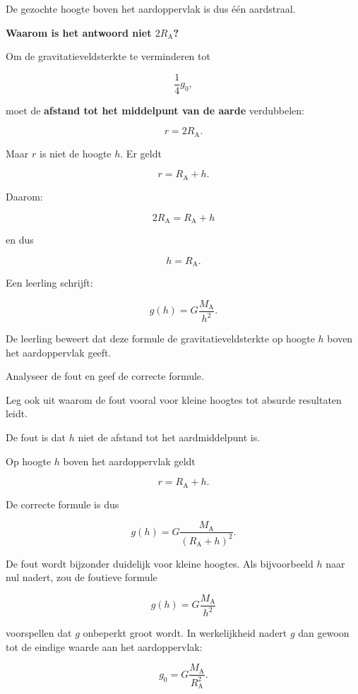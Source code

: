 \documentclass{ximera}
\begin{document}
\begin{oefening}{\oefU\ESS}
\begin{oplossing}
      De gezochte hoogte boven het aardoppervlak is dus één aardstraal.
      
      
      \textbf{Waarom is het antwoord niet $2R_\mathrm A$?}
      
      Om de gravitatieveldsterkte te verminderen tot
      
      \[
      \frac14g_0,
      \]
      
      moet de \textbf{afstand tot het middelpunt van de aarde} verdubbelen:
      
      \[
      r=2R_\mathrm A.
      \]
      
      Maar $r$ is niet de hoogte $h$. Er geldt
      
      \[
      r=R_\mathrm A+h.
      \]
      
      Daarom:
      
      \[
      2R_\mathrm A
      =
      R_\mathrm A+h
      \]
      
      en dus
      
      \[
      \boxed{
      h=R_\mathrm A.
      }
      \]
      
      \end{oplossing}

\end{oefening}


\begin{oefening}{\oefU}

Een leerling schrijft:

\[
g(h)
=
G\frac{M_\mathrm A}{h^2}.
\]

De leerling beweert dat deze formule de gravitatieveldsterkte op hoogte
$h$ boven het aardoppervlak geeft.

Analyseer de fout en geef de correcte formule.

Leg ook uit waarom de fout vooral voor kleine hoogtes tot absurde
resultaten leidt.


\begin{oplossing}

De fout is dat $h$ niet de afstand tot het aardmiddelpunt is.

Op hoogte $h$ boven het aardoppervlak geldt

\[
r=R_\mathrm A+h.
\]

De correcte formule is dus

\[
\boxed{
g(h)
=
G\frac{M_\mathrm A}{(R_\mathrm A+h)^2}.
}
\]

De fout wordt bijzonder duidelijk voor kleine hoogtes. Als bijvoorbeeld
$h$ naar nul nadert, zou de foutieve formule

\[
g(h)=G\frac{M_\mathrm A}{h^2}
\]

voorspellen dat $g$ onbeperkt groot wordt. In werkelijkheid nadert $g$
dan gewoon tot de eindige waarde aan het aardoppervlak:

\[
\boxed{
g_0=G\frac{M_\mathrm A}{R_\mathrm A^2}.
}
\]

\end{oplossing}

\end{oefening}
\end{document}

